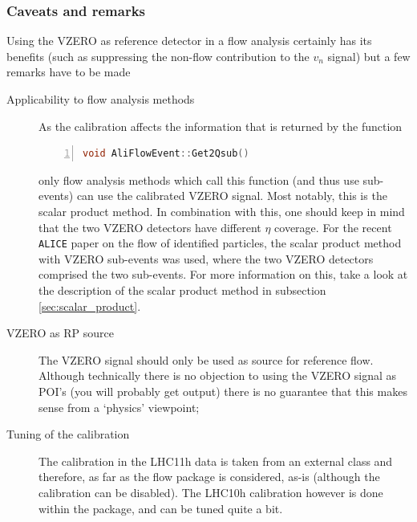 \documentclass[a4paper]{book}
\numberwithin{equation}{subsection}
\begin{document}
\subsubsection{Caveats and remarks}
Using the VZERO as reference detector in a flow analysis certainly has its benefits (such as suppressing the non-flow contribution to the $v_n$ signal) but a few remarks have to be made
\begin{description}
\item[Applicability to flow analysis methods] As the calibration affects the information that is returned by the function
\begin{lstlisting}[language=C, numbers=left]
void AliFlowEvent::Get2Qsub()\end{lstlisting}
only flow analysis methods which call this function (and thus use sub-events) can use the calibrated VZERO signal. Most notably, this is the scalar product method. In combination with this, one should keep in mind that the two VZERO detectors have different $\eta$ coverage. For the recent \texttt{ALICE} paper on the flow of identified particles, the scalar product method with VZERO sub-events was used, where the two VZERO detectors comprised the two sub-events. For more information on this, take a look at the description of the scalar product method in subsection \ref{sec:scalar_product}. 
\item[VZERO as RP source] The VZERO signal should only be used as source for reference flow. Although technically there is no objection to using the VZERO signal as POI's (you will probably get output) there is no guarantee that this makes sense from a `physics' viewpoint;
\item[Tuning of the calibration] The calibration in the LHC11h data is taken from an external class and therefore, as far as the flow package is considered, as-is (although the calibration can be disabled). The LHC10h calibration however is done within the package, and can be tuned quite a bit. 


\end{description}
\end{document}
